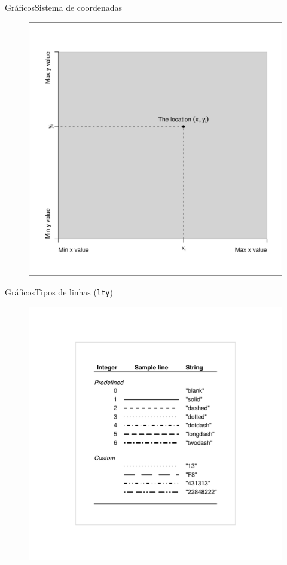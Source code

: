 \documentclass[10pt]{beamer}\usepackage[]{graphicx}\usepackage[]{color}
\begin{document}
\begin{frame}[fragile]{Gráficos}{Sistema de coordenadas}
\begin{figure}[htp]
\centering
\includegraphics[height=0.95\textheight]{figure/fig3m}
\end{figure}
\end{frame}

\begin{frame}[fragile]{Gráficos}{Tipos de linhas
    (\texttt{lty})}
\begin{figure}[htp]
\centering
\includegraphics[height=1.1\textheight]{figure/fig4m}
\end{figure}
\end{frame}
\end{document}
